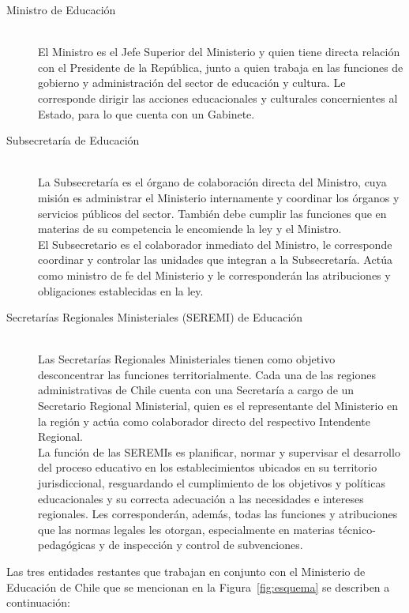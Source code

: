 \begin{description}
\item[Ministro de Educación] \hfill \\
El Ministro es el Jefe Superior del Ministerio y quien tiene directa relación con el Presidente de la República, junto a quien trabaja en las funciones de gobierno y administración del sector de educación y cultura.
Le corresponde dirigir las acciones educacionales y culturales concernientes al Estado, para lo que cuenta con un Gabinete.
\item[Subsecretaría de Educación] \hfill \\
La Subsecretaría es el órgano de colaboración directa del Ministro, cuya misión es administrar el Ministerio internamente y coordinar los órganos y servicios públicos del sector. También debe cumplir las funciones que en materias de su competencia le encomiende la ley y el Ministro. \\
El Subsecretario es el colaborador inmediato del Ministro, le corresponde coordinar y controlar las unidades que integran a la Subsecretaría. Actúa como ministro de fe del Ministerio y le corresponderán las atribuciones y obligaciones establecidas en la ley.
\item[Secretarías Regionales Ministeriales (SEREMI) de Educación] \hfill \\
Las Secretarías Regionales Ministeriales tienen como objetivo desconcentrar las funciones territorialmente. Cada una de las regiones administrativas de Chile cuenta con una Secretaría a cargo de un Secretario Regional Ministerial, quien es el representante del Ministerio en la región y actúa como colaborador directo del respectivo Intendente Regional.\\
La función de las SEREMIs es planificar, normar y supervisar el desarrollo del proceso educativo en los establecimientos ubicados en su territorio jurisdiccional, resguardando el cumplimiento de los objetivos y políticas educacionales y su correcta adecuación a las necesidades e intereses regionales. Les corresponderán, además, todas las funciones y atribuciones que las normas legales les otorgan, especialmente en materias técnico-pedagógicas y de inspección y control de subvenciones. 
\end{description}

\newpage 

Las tres entidades restantes que trabajan en conjunto con el Ministerio de Educación de Chile que se mencionan en la Figura~\ref{fig:esquema} se describen a continuación: 

